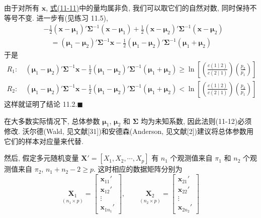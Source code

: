 \noindent{}\quad 由于对所有 $\mathbf{x}$, \hyperref[eq:11-11]{式(11-11)}中的量均属非负, 我们可以取它们的自然对数, 同时保持不等号不变. 进一步有(见练习 11.5),
\label{eq:11-13}
\begin{equation}
\begin{aligned}
&-\frac{1}{2}(\mathbf{x}-\boldsymbol{\mu}_1)'\boldsymbol{\Sigma}^{-1}(\mathbf{x}-\boldsymbol{\mu}_1)+\frac{1}{2}(\mathbf{x}-\boldsymbol{\mu}_2)'\boldsymbol{\Sigma}^{-1}(\mathbf{x}-\boldsymbol{\mu}_2)\\
&\quad =(\boldsymbol{\mu}_1-\boldsymbol{\mu}_2)'\boldsymbol{\Sigma}^{-1}\mathbf{x}-\frac{1}{2}(\boldsymbol{\mu}_1-\boldsymbol{\mu}_2)'\boldsymbol{\Sigma}^{-1}(\boldsymbol{\mu}_1+\boldsymbol{\mu}_2)
\end{aligned}
\tag{11-13}
\end{equation}
于是
\label{eq:11-14}
\begin{equation}
\begin{aligned}
R_1:\ &(\boldsymbol{\mu}_1-\boldsymbol{\mu}_2)'\boldsymbol{\Sigma}^{-1}\mathbf{x}-\frac{1}{2}(\boldsymbol{\mu}_1-\boldsymbol{\mu}_2)'\boldsymbol{\Sigma}^{-1}(\boldsymbol{\mu}_1+\boldsymbol{\mu}_2)\geqslant\ln\left[\left(\frac{c(1\mid2)}{c(2\mid1)}\right)\left(\frac{p_2}{p_1}\right)\right]\\
R_2:\ &(\boldsymbol{\mu}_1-\boldsymbol{\mu}_2)'\boldsymbol{\Sigma}^{-1}\mathbf{x}-\frac{1}{2}(\boldsymbol{\mu}_1-\boldsymbol{\mu}_2)'\boldsymbol{\Sigma}^{-1}(\boldsymbol{\mu}_1+\boldsymbol{\mu}_2)<\ln\left[\left(\frac{c(1\mid2)}{c(2\mid1)}\right)\left(\frac{p_2}{p_1}\right)\right]
\end{aligned}
\tag{11-14}
\end{equation}
这样就证明了结论 11.2.\hfill$\blacksquare$

在大多数实际情况下, 总体参数 $\boldsymbol{\mu}_1$, $\boldsymbol{\mu}_2$ 和 $\boldsymbol{\Sigma}$ 均为未知系数, 因此法则(11-12)必须修改. 沃尔德(Wald, 见文献[31])和安德森(Anderson, 见文献[2])建议将总体参数用它们的样本对应量来代替.

然后, 假定多元随机变量 $\mathbf{X}'=[X_1,X_2,\cdots,X_p]$ 有 $n_1$ 个观测值来自 $\pi_1$ 和 $n_2$ 个观测值来自 $\pi_2$, $n_1+n_2-2\geqslant p$. 这时相应的数据矩阵分别为
\label{eq:11-15}
\begin{equation}
\underset{(n_1\times p)}{\mathbf{X}_1}=\begin{bmatrix}\mathbf{x}_{11}'\\\mathbf{x}_{12}'\\\vdots\\\mathbf{x}_{1n_1}'\end{bmatrix},\qquad \underset{(n_2\times p)}{\mathbf{X}_2}=\begin{bmatrix}\mathbf{x}_{21}'\\\mathbf{x}_{22}'\\\vdots\\\mathbf{x}_{2n_2}'\end{bmatrix}
\tag{11-15}
\end{equation}

